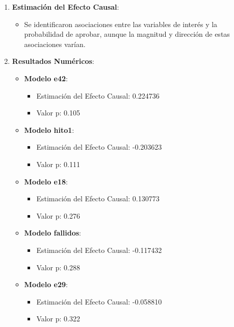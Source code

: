 \begin{enumerate}
    \item \textbf{Estimación del Efecto Causal}:
        \begin{itemize}
            \item Se identificaron asociaciones entre las variables de interés y la probabilidad de aprobar, aunque la magnitud y dirección de estas asociaciones varían.
        \end{itemize}
    
    \item \textbf{Resultados Numéricos}:
        \begin{itemize}
            \item \textbf{Modelo e42}:
                \begin{itemize}
                    \item Estimación del Efecto Causal: 0.224736
                    \item Valor p: 0.105
                \end{itemize}
            \item \textbf{Modelo hito1}:
                \begin{itemize}
                    \item Estimación del Efecto Causal: -0.203623
                    \item Valor p: 0.111
                \end{itemize}
            \item \textbf{Modelo e18}:
                \begin{itemize}
                    \item Estimación del Efecto Causal: 0.130773
                    \item Valor p: 0.276
                \end{itemize}
            \item \textbf{Modelo fallidos}:
                \begin{itemize}
                    \item Estimación del Efecto Causal: -0.117432
                    \item Valor p: 0.288
                \end{itemize}
            \item \textbf{Modelo e29}:
                \begin{itemize}
                    \item Estimación del Efecto Causal: -0.058810
                    \item Valor p: 0.322

\end{itemize}
\end{itemize}
\end{enumerate}

